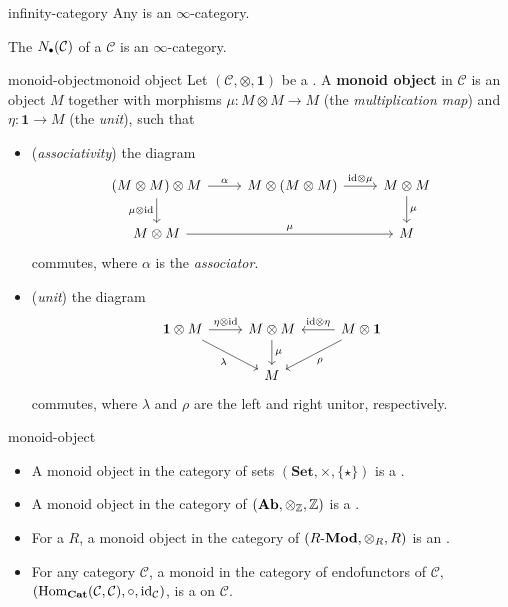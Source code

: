 \begin{example}{infinity-category}
    Any  is an $\infty$-category.
    
    The  $N_\bdot(\mathcal{C})$ of a  $\mathcal{C}$ is an $\infty$-category.
\end{example}

\begin{topic}{monoid-object}{monoid object}
    Let $(\mathcal{C}, \otimes, \textbf{1})$ be a . A \textbf{monoid object} in $\mathcal{C}$ is an object $M$ together with morphisms $\mu : M \otimes M \to M$ (the \textit{multiplication map}) and $\eta : \textbf{1} \to M$ (the \textit{unit}), such that
    \begin{itemize}
        \item (\textit{associativity}) the diagram
        \[ \begin{tikzcd} (M \otimes M) \otimes M \arrow[swap]{d}{\mu \otimes \id} \arrow{r}{\alpha} & M \otimes (M \otimes M) \arrow{r}{\id \otimes \mu} & M \otimes M \arrow{d}{\mu} \\ M \otimes M \arrow{rr}{\mu} && M \end{tikzcd} \]
        commutes, where $\alpha$ is the \textit{associator}.
        \item (\textit{unit}) the diagram
        \[ \begin{tikzcd} \textbf{1} \otimes M \arrow{r}{\eta \otimes \id} \arrow[swap]{rd}{\lambda} & M \otimes M \arrow{d}{\mu} & M \otimes \textbf{1} \arrow[swap]{l}{\id \otimes \eta} \arrow{dl}{\rho} \\ & M & \end{tikzcd} \]
        commutes, where $\lambda$ and $\rho$ are the left and right unitor, respectively.
    \end{itemize}
\end{topic}

\begin{example}{monoid-object}
    \begin{itemize}
        \item A monoid object in the category of sets $(\textbf{Set}, \times, \{ \star \})$ is a .
        \item A monoid object in the category of  $(\textbf{Ab}, \otimes_{\mathbb{Z}}, \mathbb{Z})$ is a .
        \item For a  $R$, a monoid object in the category of  $(R\textup{-}\textbf{Mod}, \otimes_R, R)$ is an .
        \item For any category $\mathcal{C}$, a monoid in the category of endofunctors of $\mathcal{C}$, $(\text{Hom}_\textbf{Cat}(\mathcal{C}, \mathcal{C}), \circ, \text{id}_\mathcal{C})$, is a  on $\mathcal{C}$.
    \end{itemize}
\end{example}